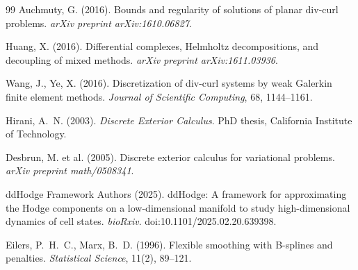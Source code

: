 \documentclass[11pt,a4paper]{article}
\begin{document}
\begin{thebibliography}{99}
Auchmuty, G. (2016). Bounds and regularity of solutions of planar div-curl
problems. \emph{arXiv preprint arXiv:1610.06827}.

Huang, X. (2016). Differential complexes, Helmholtz decompositions, and
decoupling of mixed methods. \emph{arXiv preprint arXiv:1611.03936}.

Wang, J., Ye, X. (2016). Discretization of div-curl systems by weak Galerkin
finite element methods. \emph{Journal of Scientific Computing}, 68,
1144--1161.

Hirani, A.~N. (2003). \emph{Discrete Exterior Calculus}. PhD thesis,
California Institute of Technology.

Desbrun, M. et al. (2005). Discrete exterior calculus for variational
problems. \emph{arXiv preprint math/0508341}.

ddHodge Framework Authors (2025). ddHodge: A framework for approximating the
Hodge components on a low-dimensional manifold to study high-dimensional
dynamics of cell states. \emph{bioRxiv}. doi:10.1101/2025.02.20.639398.

Eilers, P.~H.~C., Marx, B.~D. (1996). Flexible smoothing with B-splines and
penalties. \emph{Statistical Science}, 11(2), 89--121.

\end{thebibliography}
\end{document}
